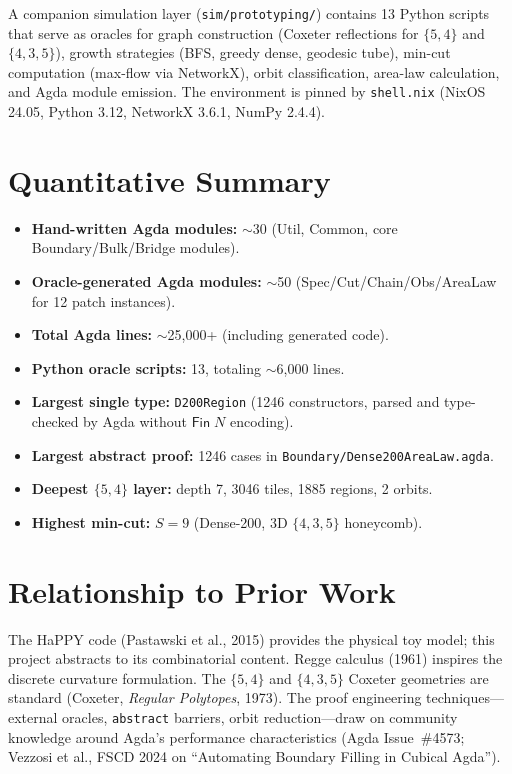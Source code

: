 \documentclass[11pt, a4paper]{article}
\theoremstyle{plain}
\theoremstyle{definition}
\begin{document}
A companion simulation layer (\texttt{sim/prototyping/}) contains
13 Python scripts that serve as oracles for graph construction
(Coxeter reflections for $\{5,4\}$ and $\{4,3,5\}$), growth
strategies (BFS, greedy dense, geodesic tube), min-cut computation
(max-flow via NetworkX), orbit classification, area-law calculation,
and Agda module emission.  The environment is pinned by
\texttt{shell.nix} (NixOS 24.05, Python 3.12, NetworkX 3.6.1,
NumPy 2.4.4).

\section{Quantitative Summary}
\label{sec:quantitative}

\begin{itemize}[nosep]
  \item \textbf{Hand-written Agda modules:} $\sim$30 (Util, Common,
    core Boundary/Bulk/Bridge modules).
  \item \textbf{Oracle-generated Agda modules:} $\sim$50
    (Spec/Cut/Chain/Obs/AreaLaw for 12 patch instances).
  \item \textbf{Total Agda lines:} $\sim$25{,}000+
    (including generated code).
  \item \textbf{Python oracle scripts:} 13, totaling
    $\sim$6{,}000 lines.
  \item \textbf{Largest single type:} \texttt{D200Region}
    (1246 constructors, parsed and type-checked by Agda without
    $\mathsf{Fin}\;N$ encoding).
  \item \textbf{Largest abstract proof:} 1246 cases in
    \texttt{Boundary/Dense200AreaLaw.agda}.
  \item \textbf{Deepest $\{5,4\}$ layer:} depth 7, 3046 tiles,
    1885 regions, 2 orbits.
  \item \textbf{Highest min-cut:} $S = 9$ (Dense-200, 3D
    $\{4,3,5\}$ honeycomb).
\end{itemize}

\section{Relationship to Prior Work}
\label{sec:related}

The HaPPY code (Pastawski et al., 2015) provides the physical toy
model; this project abstracts to its combinatorial content.  Regge
calculus (1961) inspires the discrete curvature formulation.  The
$\{5,4\}$ and $\{4,3,5\}$ Coxeter geometries are standard
(Coxeter, \emph{Regular Polytopes}, 1973).  The proof engineering
techniques---external oracles, \texttt{abstract} barriers, orbit
reduction---draw on community knowledge around Agda's performance
characteristics (Agda Issue~\#4573; Vezzosi et al., FSCD 2024 on
``Automating Boundary Filling in Cubical Agda'').
\end{document}
